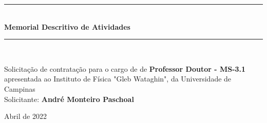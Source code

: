 \documentclass[a4paper,oneside,10pt]{article}
\begin{document}
\begin{titlepage}

\vspace{-5.0cm}

\begin{figure}[!htb]
 \label{fig:IFGW_logo}
\end{figure}

\begin{center}
\vspace{1cm}
\rule{1.0\textwidth}{1pt} \\ [0.5cm]
{\Huge \textbf{\textsf{Memorial Descritivo de Atividades}}} \\
\rule{1.0\textwidth}{1pt} \\
\vspace{2cm}

\doublespacing
{\Large \textsf{Solicita\c{c}\~{a}o de contratação para o cargo de de \textbf{Professor Doutor - MS-3.1} apresentada ao Instituto de Física "Gleb Wataghin", da Universidade de Campinas}}\\
\vspace{1.5cm}
{\LARGE \textsf{Solicitante: \textbf{André Monteiro Paschoal}}}\\
\vspace{0.5cm}

\vspace{2.0cm}

\normalsize \textsf{Abril de 2022}

\end{center}
\thispagestyle{empty}
\end{titlepage}
\end{document}
